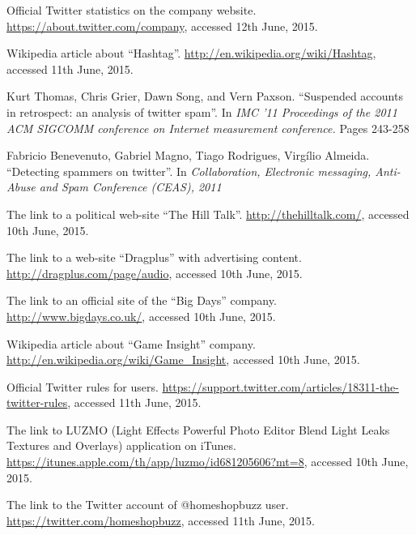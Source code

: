 \documentclass[journal, a4paper, 12pt]{article}
\begin{document}
\begin{thebibliography}{10}

    Official Twitter statistics on the company website.
    \url{https://about.twitter.com/company}, accessed 12th June, 2015.
    
    Wikipedia article about ``Hashtag''.
    \url{http://en.wikipedia.org/wiki/Hashtag}, accessed 11th June, 2015.
      
    Kurt Thomas, Chris Grier, Dawn Song, and Vern Paxson. ``Suspended accounts in    retrospect: an analysis of twitter spam''. In \textit{IMC '11 Proceedings of the 2011 ACM SIGCOMM conference on Internet measurement conference.} Pages 243-258 
    
    Fabricio Benevenuto, Gabriel Magno, Tiago Rodrigues, Virgílio Almeida. ``Detecting spammers on twitter''. In \textit{Collaboration, Electronic messaging, Anti-Abuse and Spam Conference (CEAS), 2011}

    The link to a political web-site ``The Hill Talk''.
    \url{http://thehilltalk.com/}, accessed 10th June, 2015.

    The link to a web-site ``Dragplus'' with advertising content.
      \url{http://dragplus.com/page/audio}, accessed 10th June, 2015.

    The link to an official site of the ``Big Days'' company.
      \url{http://www.bigdays.co.uk/}, accessed 10th June, 2015.

      Wikipedia article about ``Game Insight'' company.
    \url{http://en.wikipedia.org/wiki/Game_Insight}, accessed 10th June, 2015.
    
    Official Twitter rules for users.
    \url{https://support.twitter.com/articles/18311-the-twitter-rules}, accessed 11th June, 2015.
    
      The link to LUZMO (Light Effects Powerful Photo Editor Blend Light Leaks Textures and Overlays) application on iTunes.
    \url{https://itunes.apple.com/th/app/luzmo/id681205606?mt=8}, accessed 10th June, 2015.
    
    The link to the Twitter account of @homeshopbuzz user.
    \url{https://twitter.com/homeshopbuzz}, accessed 11th June, 2015.

\end{thebibliography}

\end{document}
